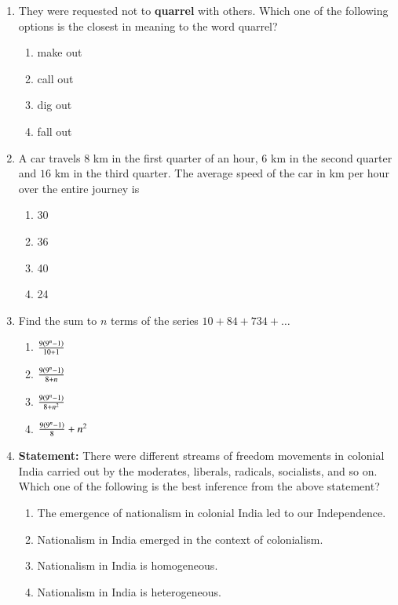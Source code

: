 \documentclass[journal,12pt,onecolumn]{IEEEtran}
\theoremstyle{remark}
\begin{document}
\begin{enumerate}
\item They were requested not to \textbf{quarrel} with others.  
Which one of the following options is the closest in meaning to the word quarrel?
\begin{multicols}{4}
\begin{enumerate}
\item make out
\item call out
\item dig out
\item fall out
\end{enumerate}
\end{multicols}
\hfill {}

\item A car travels $8$ km in the first quarter of an hour, $6$ km in the second quarter and $16$ km in the third quarter. The average speed of the car in km per hour over the entire journey is
\begin{multicols}{4}
\begin{enumerate}
\item 30
\item 36
\item 40
\item 24
\end{enumerate}
\end{multicols}
\hfill {}

\item Find the sum to \(n\) terms of the series \(10 + 84 + 734 + \ldots\)
\begin{multicols}{2}
\begin{enumerate}
\item $\frac{9\left(9^n - 1\right)}{10 + 1}$
\item $\frac{9\left(9^n - 1\right)}{8 + n}$
\item $\frac{9\left(9^n - 1\right)}{8 + n^2}$
\item $\frac{9\left(9^n - 1\right)}{8} + n^2$
\end{enumerate}
\end{multicols}
\hfill {}

\item \textbf{Statement:} There were different streams of freedom movements in colonial India carried out by the moderates, liberals, radicals, socialists, and so on.  
Which one of the following is the best inference from the above statement?

\begin{enumerate}
\item The emergence of nationalism in colonial India led to our Independence.
\item Nationalism in India emerged in the context of colonialism.
\item Nationalism in India is homogeneous.
\item Nationalism in India is heterogeneous.
\end{enumerate}
\hfill {}


\end{enumerate}
\end{document}
